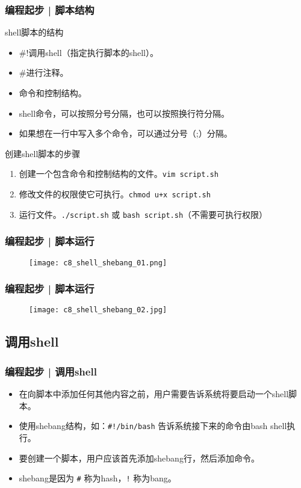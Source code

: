 \begin{frame}[fragile]
  \frametitle{编程起步 | \alert{脚本结构}}
  \begin{block}{shell脚本的结构}
    \begin{itemize}
      \item \#!调用shell（指定执行脚本的shell）。
      \item \#进行注释。
      \item 命令和控制结构。
      \item shell命令，可以按照分号分隔，也可以按照换行符分隔。
      \item 如果想在一行中写入多个命令，可以通过分号（;）分隔。
    \end{itemize}
  \end{block}
  \pause
  \begin{block}{创建shell脚本的步骤}
    \begin{enumerate}
      \item 创建一个包含命令和控制结构的文件。\verb|vim script.sh|
      \item 修改文件的权限使它可执行。\verb|chmod u+x script.sh|
      \item 运行文件。\verb|./script.sh| 或 \verb|bash script.sh|（不需要可执行权限）
    \end{enumerate}
  \end{block}
\end{frame}

\begin{frame}
  \frametitle{编程起步 | 脚本运行}
  \begin{figure}
    \centering
    \texttt{[image: c8\_shell\_shebang\_01.png]}
  \end{figure}
\end{frame}

\begin{frame}
  \frametitle{编程起步 | 脚本运行}
  \begin{figure}
    \centering
    \texttt{[image: c8\_shell\_shebang\_02.jpg]}
  \end{figure}
\end{frame}

\subsection{调用shell}
\begin{frame}[fragile]
  \frametitle{编程起步 | \alert{调用shell}}
  \begin{itemize}
    \item 在向脚本中添加任何其他内容之前，用户需要告诉系统将要启动一个shell脚本。
    \item 使用shebang结构，如：\verb|#!/bin/bash| 告诉系统接下来的命令由bash shell执行。
    \item 要创建一个脚本，用户应该首先添加shebang行，然后添加命令。
    \item shebang是因为 \verb|#| 称为hash，\verb|!| 称为bang。
  \end{itemize}
\end{frame}

